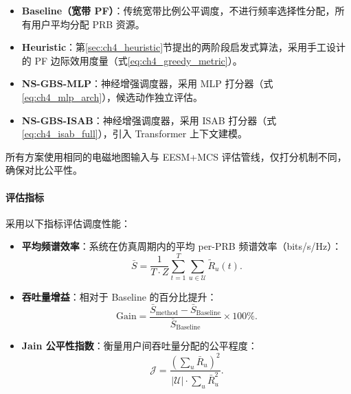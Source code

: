 \documentclass[type=master]{fduthesis}
\begin{document}
\begin{itemize}
\item \textbf{Baseline（宽带 PF）}：传统宽带比例公平调度，不进行频率选择性分配，所有用户平均分配 PRB 资源。

\item \textbf{Heuristic}：第\ref{sec:ch4_heuristic}节提出的两阶段启发式算法，采用手工设计的 PF 边际效用度量（式\eqref{eq:ch4_greedy_metric}）。

\item \textbf{NS-GBS-MLP}：神经增强调度器，采用 MLP 打分器（式\eqref{eq:ch4_mlp_arch}），候选动作独立评估。

\item \textbf{NS-GBS-ISAB}：神经增强调度器，采用 ISAB 打分器（式\eqref{eq:ch4_isab_full}），引入 Transformer 上下文建模。
\end{itemize}

所有方案使用相同的电磁地图输入与 EESM+MCS 评估管线，仅打分机制不同，确保对比公平性。

\paragraph{评估指标}
采用以下指标评估调度性能：

\begin{itemize}
\item \textbf{平均频谱效率}：系统在仿真周期内的平均 per-PRB 频谱效率（bits/s/Hz）：
\begin{equation}
\bar{S} = \frac{1}{T \cdot Z} \sum_{t=1}^{T} \sum_{u \in \mathcal{U}} \tilde{R}_u(t).
\label{eq:ch4_avg_se}
\end{equation}

\item \textbf{吞吐量增益}：相对于 Baseline 的百分比提升：
\begin{equation}
\text{Gain} = \frac{\bar{S}_{\text{method}} - \bar{S}_{\text{Baseline}}}{\bar{S}_{\text{Baseline}}} \times 100\%.
\label{eq:ch4_gain}
\end{equation}

\item \textbf{Jain 公平性指数}：衡量用户间吞吐量分配的公平程度：
\begin{equation}
\mathcal{J} = \frac{\left(\sum_{u} \bar{R}_u\right)^2}{|\mathcal{U}| \cdot \sum_{u} \bar{R}_u^2}.
\label{eq:ch4_jain}
\end{equation}
\end{itemize}

\end{document}
